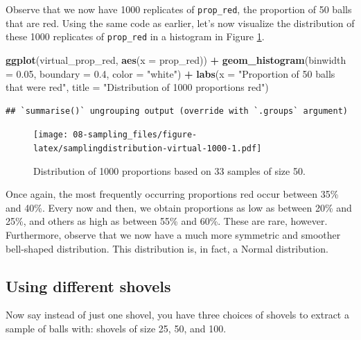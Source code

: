\documentclass[
]{book}
\newenvironment{Shaded}{\begin{snugshade}}{\end{snugshade}}
\newcommand{\DataTypeTok}[1]{\textcolor[rgb]{0.13,0.29,0.53}{#1}}
\newcommand{\FloatTok}[1]{\textcolor[rgb]{0.00,0.00,0.81}{#1}}
\newcommand{\KeywordTok}[1]{\textcolor[rgb]{0.13,0.29,0.53}{\textbf{#1}}}
\newcommand{\NormalTok}[1]{#1}
\newcommand{\OperatorTok}[1]{\textcolor[rgb]{0.81,0.36,0.00}{\textbf{#1}}}
\newcommand{\StringTok}[1]{\textcolor[rgb]{0.31,0.60,0.02}{#1}}
\begin{document}
Observe that we now have 1000 replicates of \texttt{prop\_red}, the proportion of 50 balls that are red. Using the same code as earlier, let's now visualize the distribution of these 1000 replicates of \texttt{prop\_red} in a histogram in Figure \ref{fig:samplingdistribution-virtual-1000}.

\begin{Shaded}
\begin{Highlighting}[]
\KeywordTok{ggplot}\NormalTok{(virtual_prop_red, }\KeywordTok{aes}\NormalTok{(}\DataTypeTok{x =}\NormalTok{ prop_red)) }\OperatorTok{+}
\StringTok{  }\KeywordTok{geom_histogram}\NormalTok{(}\DataTypeTok{binwidth =} \FloatTok{0.05}\NormalTok{, }\DataTypeTok{boundary =} \FloatTok{0.4}\NormalTok{, }\DataTypeTok{color =} \StringTok{"white"}\NormalTok{) }\OperatorTok{+}
\StringTok{  }\KeywordTok{labs}\NormalTok{(}\DataTypeTok{x =} \StringTok{"Proportion of 50 balls that were red"}\NormalTok{, }
       \DataTypeTok{title =} \StringTok{"Distribution of 1000 proportions red"}\NormalTok{) }
\end{Highlighting}
\end{Shaded}

\begin{verbatim}
## `summarise()` ungrouping output (override with `.groups` argument)
\end{verbatim}

\begin{figure}
\centering
\texttt{[image: 08-sampling\_files/figure-latex/samplingdistribution-virtual-1000-1.pdf]}
\caption{\label{fig:samplingdistribution-virtual-1000}Distribution of 1000 proportions based on 33 samples of size 50.}
\end{figure}

Once again, the most frequently occurring proportions red occur between 35\% and 40\%. Every now and then, we obtain proportions as low as between 20\% and 25\%, and others as high as between 55\% and 60\%. These are rare, however. Furthermore, observe that we now have a much more symmetric and smoother bell-shaped distribution. This distribution is, in fact, a Normal distribution.

\hypertarget{different-shovels}{%
\subsection{Using different shovels}\label{different-shovels}}

Now say instead of just one shovel, you have three choices of shovels to extract a sample of balls with: shovels of size 25, 50, and 100.
\end{document}
